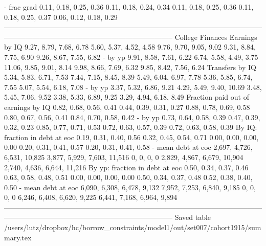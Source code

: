                            - frac grad       0.11, 0.18, 0.25, 0.36       0.11, 0.18, 0.24, 0.34   0.11, 0.18, 0.25, 0.36       0.11, 0.18, 0.25, 0.37       0.06, 0.12, 0.18, 0.29
-----------------------------------------------------------------------------------------------------------------------------------------------------------------------------------
                      College Finances                                                                                                                                             
                        Earnings by IQ       9.27, 8.79, 7.68, 6.78       5.60, 5.37, 4.52, 4.58   9.76, 9.70, 9.05, 9.02       9.31, 8.84, 7.75, 6.90       9.26, 8.67, 7.55, 6.82
                               - by yp       9.91, 8.58, 7.61, 6.22       6.74, 5.58, 4.49, 3.75  11.06, 9.85, 9.01, 8.14       9.98, 8.66, 7.69, 6.32       9.85, 8.42, 7.56, 6.24
                       Transfers by IQ       5.34, 5.83, 6.71, 7.53       7.44, 7.15, 8.45, 8.39   5.49, 6.04, 6.97, 7.78       5.36, 5.85, 6.74, 7.55       5.07, 5.54, 6.18, 7.08
                               - by yp       3.37, 5.32, 6.86, 9.21      4.29, 5.49, 9.40, 10.69   3.48, 5.45, 7.06, 9.52       3.38, 5.33, 6.89, 9.25       3.29, 4.94, 6.18, 8.49
   Fraction paid out of earnings by IQ       0.82, 0.68, 0.56, 0.41       0.44, 0.39, 0.31, 0.27   0.88, 0.78, 0.69, 0.58       0.80, 0.67, 0.56, 0.41       0.84, 0.70, 0.58, 0.42
                               - by yp       0.73, 0.64, 0.58, 0.39       0.47, 0.39, 0.32, 0.23   0.85, 0.77, 0.71, 0.53       0.72, 0.63, 0.57, 0.39       0.72, 0.63, 0.58, 0.39
        By IQ: fraction in debt at eoc       0.19, 0.31, 0.40, 0.56       0.32, 0.45, 0.54, 0.71   0.00, 0.00, 0.00, 0.00       0.20, 0.31, 0.41, 0.57       0.20, 0.31, 0.41, 0.58
                    - mean debt at eoc  2,697, 4,726, 6,531, 10,825  3,877, 5,929, 7,603, 11,516               0, 0, 0, 0  2,829, 4,867, 6,679, 10,904  2,740, 4,636, 6,644, 11,216
        By yp: fraction in debt at eoc       0.50, 0.34, 0.37, 0.46       0.63, 0.58, 0.48, 0.51   0.00, 0.00, 0.00, 0.00       0.50, 0.34, 0.37, 0.48       0.52, 0.38, 0.40, 0.50
                    - mean debt at eoc   6,090, 6,308, 6,478, 9,132   7,952, 7,253, 6,840, 9,185               0, 0, 0, 0   6,246, 6,408, 6,620, 9,225   6,441, 7,168, 6,964, 9,894
-----------------------------------------------------------------------------------------------------------------------------------------------------------------------------------
Saved table  /users/lutz/dropbox/hc/borrow_constraints/model1/out/set007/cohort1915/summary.tex 

